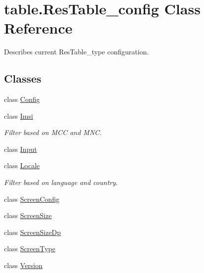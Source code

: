 \hypertarget{classtable_1_1ResTable__config}{}\section{table.\+Res\+Table\+\_\+config Class Reference}
\label{classtable_1_1ResTable__config}


Describes current Res\+Table\+\_\+type configuration.  


\subsection*{Classes}
\begin{DoxyCompactItemize}
\item 
class \mbox{\hyperlink{classtable_1_1ResTable__config_1_1Config}{Config}}
\item 
class \mbox{\hyperlink{classtable_1_1ResTable__config_1_1Imsi}{Imsi}}
\begin{DoxyCompactList}\small\item\em Filter based on M\+CC and M\+NC. \end{DoxyCompactList}\item 
class \mbox{\hyperlink{classtable_1_1ResTable__config_1_1Input}{Input}}
\item 
class \mbox{\hyperlink{classtable_1_1ResTable__config_1_1Locale}{Locale}}
\begin{DoxyCompactList}\small\item\em Filter based on language and country. \end{DoxyCompactList}\item 
class \mbox{\hyperlink{classtable_1_1ResTable__config_1_1ScreenConfig}{Screen\+Config}}
\item 
class \mbox{\hyperlink{classtable_1_1ResTable__config_1_1ScreenSize}{Screen\+Size}}
\item 
class \mbox{\hyperlink{classtable_1_1ResTable__config_1_1ScreenSizeDp}{Screen\+Size\+Dp}}
\item 
class \mbox{\hyperlink{classtable_1_1ResTable__config_1_1ScreenType}{Screen\+Type}}
\item 
class \mbox{\hyperlink{classtable_1_1ResTable__config_1_1Version}{Version}}
\end{DoxyCompactItemize}
